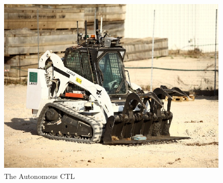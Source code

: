 \documentclass[letterpaper]{article}
\newcommand\maNote[1]{\todo[inline, author=Maor, color=green]{#1}}
\begin{document}
{%



\begin{figure}[t]
\centering
\vspace{-0cm}
\includegraphics[scale=0.38]{bobcat1.jpg}
\vspace{-0.1cm}
\caption{The Autonomous CTL}
\label{fig:bobcat}
\vspace{-0.5cm}
\end{figure}



}
\end{document}
